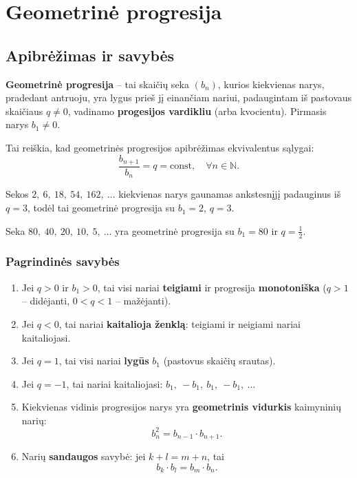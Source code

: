 \section{Geometrinė progresija}

\subsection{Apibrėžimas ir savybės}

\begin{definition}
\textbf{Geometrinė progresija} – tai skaičių seka $(b_n)$, kurios kiekvienas narys, pradedant antruoju, yra lygus prieš jį einančiam nariui, padaugintam iš pastovaus skaičiaus $q \neq 0$, vadinamo \textbf{progesijos vardikliu} (arba kvocientu). Pirmasis narys $b_1 \neq 0$.
\end{definition}

Tai reiškia, kad geometrinės progresijos apibrėžimas ekvivalentus sąlygai:
\[
\frac{b_{n+1}}{b_n} = q = \text{const}, \quad \forall n \in \mathbb{N}.
\]

\begin{example}
Sekos $2,\ 6,\ 18,\ 54,\ 162,\ \ldots$ kiekvienas narys gaunamas ankstesnįjį padauginus iš $q = 3$, todėl tai geometrinė progresija su $b_1 = 2$, $q = 3$.
\end{example}

\begin{example}
Seka $80,\ 40,\ 20,\ 10,\ 5,\ \ldots$ yra geometrinė progresija su $b_1 = 80$ ir $q = \tfrac{1}{2}$.
\end{example}

\subsubsection*{Pagrindinės savybės}

\begin{enumerate}[label=\arabic*.]
    \item Jei $q > 0$ ir $b_1 > 0$, tai visi nariai \textbf{teigiami} ir progresija \textbf{monotoniška} ($q > 1$ – didėjanti, $0 < q < 1$ – mažėjanti).
    \item Jei $q < 0$, tai nariai \textbf{kaitalioja ženklą}: teigiami ir neigiami nariai kaitaliojasi.
    \item Jei $q = 1$, tai visi nariai \textbf{lygūs} $b_1$ (pastovus skaičių srautas).
    \item Jei $q = -1$, tai nariai kaitaliojasi: $b_1,\ -b_1,\ b_1,\ -b_1,\ \ldots$
    \item Kiekvienas vidinis progresijos narys yra \textbf{geometrinis vidurkis} kaimyninių narių:
    \[
        b_n^2 = b_{n-1} \cdot b_{n+1}.
    \]
    \item Narių \textbf{sandaugos} savybė: jei $k + l = m + n$, tai
    \[
        b_k \cdot b_l = b_m \cdot b_n.
    \]
\end{enumerate}

